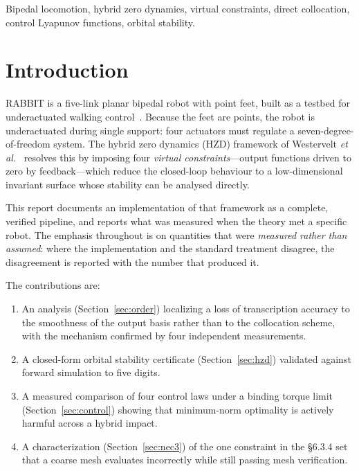 \documentclass[10pt,conference]{IEEEtran}
\begin{document}
\begin{IEEEkeywords}
Bipedal locomotion, hybrid zero dynamics, virtual constraints, direct
collocation, control Lyapunov functions, orbital stability.
\end{IEEEkeywords}

\section{Introduction}

RABBIT is a five-link planar bipedal robot with point feet,
built as a testbed for underactuated walking control~\cite{chevallereau2003}.
Because the feet are points, the robot is underactuated during single support:
four actuators must regulate a seven-degree-of-freedom system. The hybrid zero
dynamics (HZD) framework of Westervelt \emph{et al.}~\cite{westervelt2007}
resolves this by imposing four \emph{virtual constraints}---output functions
driven to zero by feedback---which reduce the closed-loop behaviour to a
low-dimensional invariant surface whose stability can be analysed directly.

This report documents an implementation of that framework as a complete,
verified pipeline, and reports what was measured when the theory met a
specific robot. The emphasis throughout is on quantities that were
\emph{measured rather than assumed}: where the implementation and the standard
treatment disagree, the disagreement is reported with the number that produced
it.

The contributions are:

\begin{enumerate}
\item An analysis (Section~\ref{sec:order}) localizing a loss of transcription
      accuracy to the smoothness of the output basis rather than to the
      collocation scheme, with the mechanism confirmed by four independent
      measurements.
\item A closed-form orbital stability certificate (Section~\ref{sec:hzd})
      validated against forward simulation to five digits.
\item A measured comparison of four control laws under a binding torque limit
      (Section~\ref{sec:control}) showing that minimum-norm optimality is
      actively harmful across a hybrid impact.
\item A characterization (Section~\ref{sec:nec3}) of the one constraint in the
      \S6.3.4 set that a coarse mesh evaluates incorrectly while still passing
      mesh verification.
\end{enumerate}
\end{document}

